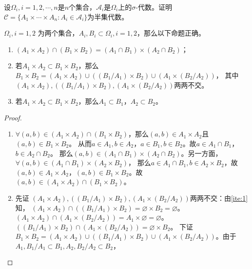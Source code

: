 \documentclass{ctexart}
\begin{document}
\begin{problem}\label{pro:1.4.9}
  设\(\Omega_i ,i=1,2,\cdots,n\)是\(n \)个集合，\(\mathcal{A}_i \)是\(\Omega_i \)上的\(\sigma \)-代数。证明\(\mathcal{C}=\{A_1 \times \cdots \times A_n:A_i \in \mathcal{A}_i\} \)为半集代数。
\end{problem}
\begin{solution}
  \begin{lemma}\label{lem:1.4.9}
    \(\Omega_i,i=1,2 \) 为两个集合，\(A_i,B_i \subset \Omega_i,i=1,2\)，那么以下命题正确。
    \begin{enumerate}
      \item \label{ite:1} \((A_1 \times A_2) \cap (B_1 \times B_2)=(A_1 \cap B_1) \times (A_2 \cap B_2) \)；
      \item \label{ite:2} 若\(A_1 \times A_2 \subset B_1 \times B_2 \)，那么\(B_1 \times B_2 = (A_1 \times A_2) \cup ((B_1 / A_1) \times B_2) \cup (A_1 \times (B_2 / A_2)) \)，
        其中\((A_1 \times A_2) , ((B_1 / A_1) \times B_2) , (A_1 \times (B_2 / A_2))\)两两不交。
      \item \label{ite:3} 若\(A_1 \times A_2 \subset B_1 \times B_2 \)，那么\(A_1 \subset B_1 \)，\(A_2 \subset B_2 \)。
    \end{enumerate}
  \end{lemma}
 \begin{proof}
   \begin{enumerate}
     \item \(\forall (a,b) \in (A_1 \times A_2) \cap (B_1 \times B_2) \)，那么\((a,b) \in A_1 \times A_2 \)且\((a,b) \in B_1 \times B_2 \)。
    从而\(a \in A_1, b \in A_2 \)，\(a \in B_1,b \in B_2 \)。故\(a \in A_1 \cap B_1 \)， \(b \in A_2 \cap B_2 \)。
    那么\((a,b) \in (A_1 \cap B_1) \times (A_2 \cap B_2) \)。另一方面，\(\forall (a,b) \in (A_1 \cap B_1)\times (A_2 \times B_2) \)，
    那么\(a \in A_1 \cap B_1,b \in A_2 \times B_2 \)，故\((a,b) \in A_1 \times A_2 \)，\((a,b) \in B_1 \times B_2 \)。故\((a,b) \in (A_1 \times A_2)\cap (B_1 \times B_2) \)。
  \item 先证 \((A_1 \times A_2) , ((B_1 / A_1) \times B_2) , (A_1 \times (B_2 / A_2))\)两两不交：由\ref{ite:1}知， \((A_1 \times A_2) \cap ((B_1 / A_1)\times B_2)=\varnothing \times B_2 =\varnothing \)。
    \((A_1 \times A_2) \cap (A_1 \times(B_2 / A_2))=A_1 \times \varnothing=\varnothing \)。\(((B_1/A_1)\times B_2)\cap (A_1 \times (B_2 /A_2))= \varnothing \times B_2 \)。
       下证\(B_1 \times B_2 = (A_1 \times A_2) \cup ((B_1 / A_1) \times B_2) \cup (A_1 \times (B_2 / A_2)) \)。由于\(A_1, B_1 / A_1 \subset B_1, A_2, B_2/A_2 \subset B_2 \)，

\end{enumerate}
\end{proof}
\end{solution}
\end{document}
